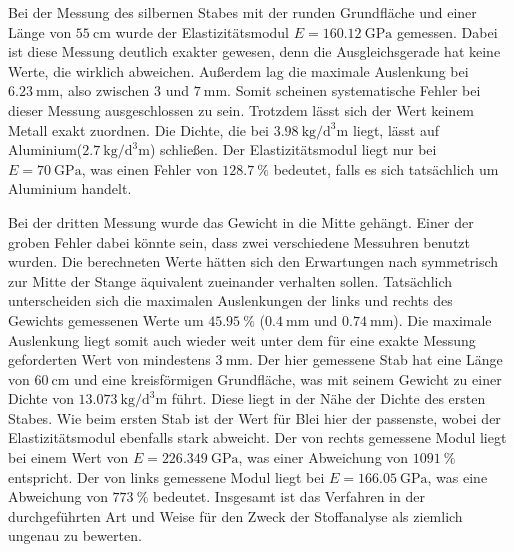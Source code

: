 \noindent Bei der Messung des silbernen Stabes mit der runden Grundfläche und einer Länge von $\SI{55}{\centi\meter}$ wurde der Elastizitätsmodul  $E = \SI{160,12}{\giga\pascal}$ gemessen. Dabei ist diese Messung deutlich exakter gewesen, denn die Ausgleichsgerade hat keine Werte, die wirklich abweichen. Außerdem lag die maximale Auslenkung bei $\SI{6,23}{\milli\meter}$, also zwischen $3$ und $\SI{7}{\milli\meter}$. Somit scheinen systematische Fehler bei dieser Messung ausgeschlossen zu sein. Trotzdem lässt sich der Wert keinem Metall exakt zuordnen. Die Dichte, die bei $\SI{3.98}{\kilo\gram\per\cubic\deci\meter}$ liegt, lässt auf Aluminium($\SI{2,7}{\kilo\gram\per\cubic\deci\meter}$) schließen. Der Elastizitätsmodul liegt nur bei $E =\SI{70}{\giga\pascal}$, was einen Fehler von $\SI{128,7}{\percent}$ bedeutet, falls es sich tatsächlich um Aluminium handelt.

\noindent Bei der dritten Messung wurde das Gewicht in die Mitte gehängt. Einer der groben Fehler dabei könnte sein, dass zwei verschiedene Messuhren benutzt wurden. Die berechneten Werte hätten sich den Erwartungen nach symmetrisch zur Mitte der Stange äquivalent zueinander verhalten sollen. Tatsächlich unterscheiden sich die maximalen Auslenkungen der links und rechts des Gewichts gemessenen Werte um $\SI{45,95}{\percent}$ ($\SI{0,4}{\milli\meter}$ und $\SI{0,74}{\milli\meter}$). 
Die maximale Auslenkung liegt somit auch wieder weit unter dem für eine exakte Messung geforderten Wert von mindestens $\SI{3}{\milli\meter}$. 
Der hier gemessene Stab hat eine Länge von $\SI{60}{\centi\meter}$ und eine kreisförmigen Grundfläche, was mit seinem Gewicht zu einer Dichte von $\SI{13,073}{\kilo\gram\per\cubic\deci\meter}$ führt. Diese liegt in der Nähe der Dichte des ersten Stabes. Wie beim ersten Stab ist der Wert für Blei hier der passenste, wobei der Elastizitätsmodul ebenfalls stark abweicht. 
Der von rechts gemessene Modul liegt bei einem Wert von $E =\SI{226,349}{\giga\pascal}$, was einer Abweichung von $\SI{1091}{\percent}$ entspricht. Der von links gemessene Modul liegt bei $E =\SI{166,05}{\giga\pascal}$, was eine Abweichung von $\SI{773}{\percent}$ bedeutet. 
\noindent Insgesamt ist das Verfahren in der durchgeführten Art und Weise für den Zweck der Stoffanalyse als ziemlich ungenau zu bewerten. 


